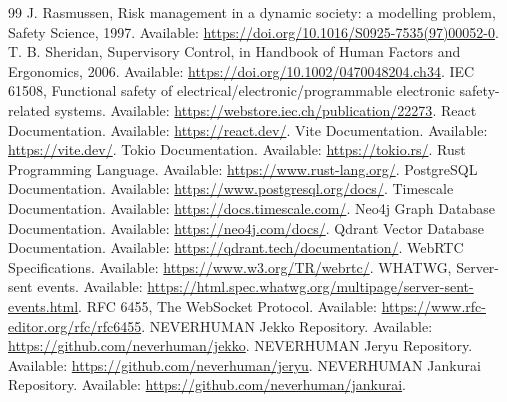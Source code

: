 \documentclass[10pt,journal,onecolumn]{IEEEtran}
\begin{document}
\begin{thebibliography}{99}
 J. Rasmussen, Risk management in a dynamic society: a modelling problem, Safety Science, 1997. Available: \url{https://doi.org/10.1016/S0925-7535(97)00052-0}.
 T. B. Sheridan, Supervisory Control, in Handbook of Human Factors and Ergonomics, 2006. Available: \url{https://doi.org/10.1002/0470048204.ch34}.
 IEC 61508, Functional safety of electrical/electronic/programmable electronic safety-related systems. Available: \url{https://webstore.iec.ch/publication/22273}.
 React Documentation. Available: \url{https://react.dev/}.
 Vite Documentation. Available: \url{https://vite.dev/}.
 Tokio Documentation. Available: \url{https://tokio.rs/}.
 Rust Programming Language. Available: \url{https://www.rust-lang.org/}.
 PostgreSQL Documentation. Available: \url{https://www.postgresql.org/docs/}.
 Timescale Documentation. Available: \url{https://docs.timescale.com/}.
 Neo4j Graph Database Documentation. Available: \url{https://neo4j.com/docs/}.
 Qdrant Vector Database Documentation. Available: \url{https://qdrant.tech/documentation/}.
 WebRTC Specifications. Available: \url{https://www.w3.org/TR/webrtc/}.
 WHATWG, Server-sent events. Available: \url{https://html.spec.whatwg.org/multipage/server-sent-events.html}.
 RFC 6455, The WebSocket Protocol. Available: \url{https://www.rfc-editor.org/rfc/rfc6455}.
 NEVERHUMAN Jekko Repository. Available: \url{https://github.com/neverhuman/jekko}.
 NEVERHUMAN Jeryu Repository. Available: \url{https://github.com/neverhuman/jeryu}.
 NEVERHUMAN Jankurai Repository. Available: \url{https://github.com/neverhuman/jankurai}.
\end{thebibliography}
\end{document}
